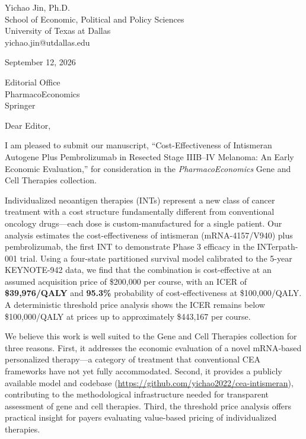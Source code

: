 \documentclass[11pt]{article}
\begin{document}
\enlargethispage{1.5\baselineskip}

\begin{flushleft}

Yichao Jin, Ph.D.\\
School of Economic, Political and Policy Sciences\\
University of Texas at Dallas\\
yichao.jin@utdallas.edu\\

\vspace{12pt}

September 12, 2026\\

\vspace{12pt}

Editorial Office\\
PharmacoEconomics\\
Springer\\

\vspace{12pt}

Dear Editor,\\

\vspace{12pt}

I am pleased to submit our manuscript, ``Cost-Effectiveness of Intismeran Autogene Plus Pembrolizumab in Resected Stage IIIB--IV Melanoma: An Early Economic Evaluation,'' for consideration in the \textit{PharmacoEconomics} Gene and Cell Therapies collection.

Individualized neoantigen therapies (INTs) represent a new class of cancer treatment with a cost structure fundamentally different from conventional oncology drugs---each dose is custom-manufactured for a single patient. Our analysis estimates the cost-effectiveness of intismeran (mRNA-4157/V940) plus pembrolizumab, the first INT to demonstrate Phase 3 efficacy in the INTerpath-001 trial. Using a four-state partitioned survival model calibrated to the 5-year KEYNOTE-942 data, we find that the combination is cost-effective at an assumed acquisition price of \$200,000 per course, with an ICER of \textbf{\$39,976/QALY} and \textbf{95.3\%} probability of cost-effectiveness at \$100,000/QALY. A deterministic threshold price analysis shows the ICER remains below \$100,000/QALY at prices up to approximately \$443,167 per course.

We believe this work is well suited to the Gene and Cell Therapies collection for three reasons. First, it addresses the economic evaluation of a novel mRNA-based personalized therapy---a category of treatment that conventional CEA frameworks have not yet fully accommodated. Second, it provides a publicly available model and codebase (\url{https://github.com/yichao2022/cea-intismeran}), contributing to the methodological infrastructure needed for transparent assessment of gene and cell therapies. Third, the threshold price analysis offers practical insight for payers evaluating value-based pricing of individualized therapies.


\end{flushleft}
\end{document}

